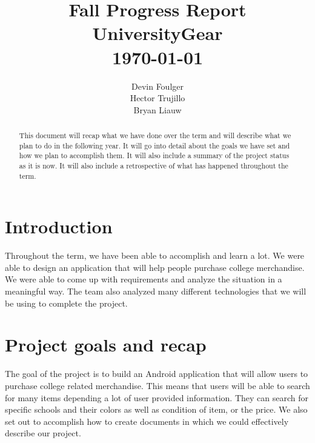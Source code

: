 \documentclass[journal,compsoc, 10pt, draftclsnofoot, onecolumn]{IEEEtran}
\begin{document}
\title{\vspace{20em}Fall Progress Report \\{\vspace{-1ex}\huge UniversityGear} \\
{\large \today}}
\author{\vspace{10ex}Devin Foulger \\{\vspace{-1ex}Hector Trujillo}
\\{\vspace{-1ex}Bryan Liauw}}

\begin{titlepage}

\maketitle
\thispagestyle{empty}

\begin{abstract}
This document will recap what we have done over the term and will describe 
what we plan to do in the following year. It will go into detail about the goals 
we have set and how we plan to accomplish them. It will also include a summary 
of the project status as it is now. It will also include a retrospective of what 
has happened throughout the term.
\end{abstract}

\end{titlepage}

\tableofcontents

\section{Introduction}
Throughout the term, we have been able to accomplish and learn a lot. We were 
able to design an application that will help people purchase college merchandise. 
We were able to come up with requirements and analyze the situation in a 
meaningful way. The team also analyzed many different technologies that we 
will be using to complete the project. 

\section{Project goals and recap}
The goal of the project is to build an Android application that will allow users 
to purchase college related merchandise. This means that users will be able to 
search for many items depending a lot of user provided information. They can 
search for specific schools and their colors as well as condition of item, or 
the price. We also set out to accomplish how to create documents in which we 
could effectively describe our project. \newline
\end{document}
